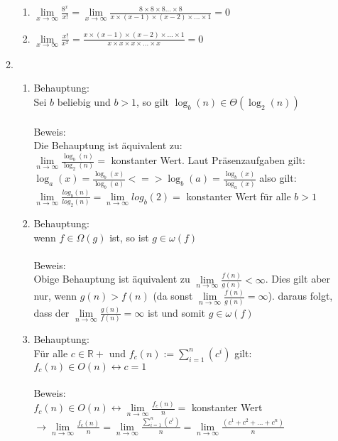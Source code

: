 \documentclass[12pt,a4paper]{article}
\begin{document}
\begin{enumerate}
\begin{enumerate}
\begin{enumerate}
	\item $\lim\limits_{x \to \infty}{\frac{8^{x}}{x!}} = \lim\limits_{x \to \infty}{\frac{8 \times 8\times 8 \dots \times 8}{x\times(x-1)\times(x-2)\times \dots \times1}} = 0 $
	\item $\lim\limits_{x \to \infty}{\frac{x!}{x^{x}}} = \frac{x\times(x-1)\times(x-2)\times \dots \times 1}{x\times x\times x\times \dots \times x} = 0$ 
    \end{enumerate}
    \item
    \begin{enumerate}
    \item 
    Behauptung: \\
    Sei $b$ beliebig und $b > 1$, so gilt $\log_{b}(n) \in \Theta(\log_{2}(n))$\\\\
Beweis:\\ Die Behauptung ist äquivalent zu: \\ $\lim\limits_{n \to \infty}{\frac{\log_{b}(n)}{\log_{2}(n)}} = $ konstanter Wert.
Laut Präsenzaufgaben gilt: $\log_{a}(x) = \frac{\log_{b}(x)}{\log_{b}(a)} <=> \log_{b}(a) = \frac{\log_{b}(x)}{\log_{a}(x)}$
also gilt: $\lim\limits_{n \to \infty}{\frac{log_{b}(n)}{log_{2}(n)}} = \lim\limits_{n \to \infty}{log_{b}(2)} =$ konstanter Wert für alle $b > 1$\\
\item
Behauptung:\\ wenn $f \in \Omega(g)$ ist, so ist $g \in \omega(f)$\\\\
Beweis:\\ Obige Behauptung ist äquivalent zu $\lim\limits_{n \to \infty}{\frac{f(n)}{g(n)}} < \infty $.
Dies gilt aber nur, wenn $g(n) > f(n)$ (da sonst $\lim\limits_{n \to \infty}{\frac{f(n)}{g(n)}}  = \infty$).
daraus folgt, dass der $\lim\limits_{n \to \infty}{\frac{g(n)}{f(n)}} = \infty$ ist und somit $g \in \omega(f)$ \\
\item 
Behauptung: \\ Für alle $c \in \mathbb{R+} $ und $f_{c}(n) := \sum\limits_{i=1}^{n}(c^i)$ gilt:\\ $f_{c}(n) \in O(n) \leftrightarrow c = 1$ \\\\
Beweis:\\ $f_{c}(n) \in O(n) \leftrightarrow \lim\limits_{n \to \infty}{\frac{f_{c}(n)}{n}} = $ konstanter Wert \\
$\rightarrow \lim\limits_{n \to \infty}{\frac{f_{c}(n)}{n}} = \lim\limits_{n \to \infty}\frac{{\sum\limits_{i=1}^{n}{(c^{i})}}}{n} = \lim\limits_{n \to \infty}{\frac{(c^{1} + c^{2} + \dots + c^{n})}{n}} $\\

\end{enumerate}
\end{enumerate}
\end{enumerate}
\end{document}
